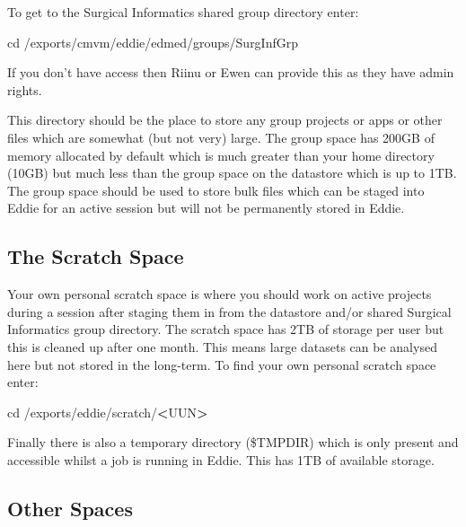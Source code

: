 \documentclass[]{book}
\newenvironment{Shaded}{\begin{snugshade}}{\end{snugshade}}
\newcommand{\BuiltInTok}[1]{#1}
\newcommand{\NormalTok}[1]{#1}
\newcommand{\OperatorTok}[1]{\textcolor[rgb]{0.81,0.36,0.00}{\textbf{#1}}}
\begin{document}
To get to the Surgical Informatics shared group directory enter:

\begin{Shaded}
\begin{Highlighting}[]
\BuiltInTok{cd}\NormalTok{ /exports/cmvm/eddie/edmed/groups/SurgInfGrp}
\end{Highlighting}
\end{Shaded}

If you don't have access then Riinu or Ewen can provide this as they have admin rights.

This directory should be the place to store any group projects or apps or other files which are somewhat (but not very) large. The group space has 200GB of memory allocated by default which is much greater than your home directory (10GB) but much less than the group space on the datastore which is up to 1TB. The group space should be used to store bulk files which can be staged into Eddie for an active session but will not be permanently stored in Eddie.

\hypertarget{the-scratch-space}{%
\subsection{The Scratch Space}\label{the-scratch-space}}

Your own personal scratch space is where you should work on active projects during a session after staging them in from the datastore and/or shared Surgical Informatics group directory. The scratch space has 2TB of storage per user but this is cleaned up after one month. This means large datasets can be analysed here but not stored in the long-term. To find your own personal scratch space enter:

\begin{Shaded}
\begin{Highlighting}[]
\BuiltInTok{cd}\NormalTok{ /exports/eddie/scratch/}\OperatorTok{<}\NormalTok{UUN}\OperatorTok{>}
\end{Highlighting}
\end{Shaded}

Finally there is also a temporary directory (\$TMPDIR) which is only present and accessible whilst a job is running in Eddie. This has 1TB of available storage.

\hypertarget{other-spaces}{%
\subsection{Other Spaces}\label{other-spaces}}
\end{document}
